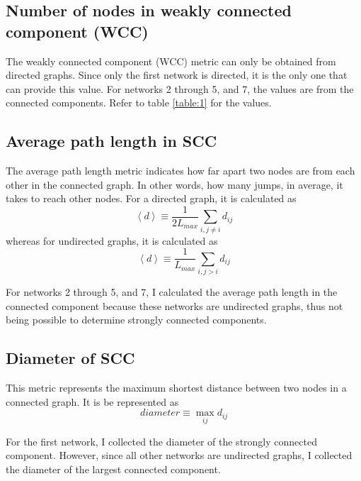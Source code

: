 \subsection{Number of nodes in weakly connected component (WCC)}
The weakly connected component (WCC) metric can only be obtained from directed graphs. Since only the first network is directed, it is the only one that can provide this value. For networks 2 through 5, and 7, the values are from the connected components. Refer to table \ref{table:1} for the values.

\subsection{Average path length in SCC}
The average path length metric indicates how far apart two nodes are from each other in the connected graph. In other words, how many jumps, in average, it takes to reach other nodes. For a directed graph, it is calculated as
\begin{equation}
    \left\langle d \right\rangle \equiv \frac{1}{2L_{max}}\sum_{i,j \neq i}d_{ij}
    \label{equation:dir_avg_path_len}
\end{equation}
whereas for undirected graphs, it is calculated as
\begin{equation}
    \left\langle d \right\rangle \equiv \frac{1}{L_{max}}\sum_{i,j >  i}d_{ij}
    \label{equation:undir_avg_path_len}
\end{equation}

For networks 2 through 5, and 7, I calculated the average path length in the connected component because these networks are undirected graphs, thus not being possible to determine strongly connected components.

\subsection{Diameter of SCC}
This metric represents the maximum shortest distance between two nodes in a connected graph. It is be represented as
\begin{equation}
    diameter \equiv \max_{ij}d_{ij}
    \label{equation:diameter}
\end{equation}

For the first network, I collected the diameter of the strongly connected component. However, since all other networks are undirected graphs, I collected the diameter of the largest connected component.

